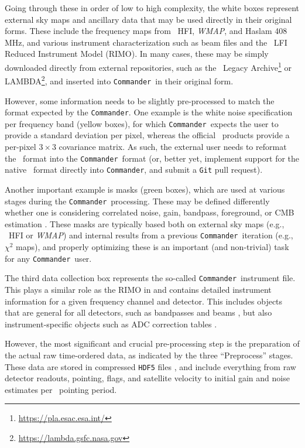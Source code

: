 \documentclass[twocolumn]{aa}
\def\WMAP{\textit{WMAP}}
\def\commander{\texttt{Commander}}
\begin{document}
Going through these in order of low to high complexity, the white boxes represent external sky maps and ancillary data that may be used directly in their original forms. These include the frequency maps from \Planck\ HFI, \WMAP, and Haslam 408\,MHz, and various instrument characterization such as beam files and the \Planck\ LFI Reduced Instrument Model (RIMO). In many cases, these may be simply downloaded directly from external repositories, such as the \Planck\ Legacy Archive\footnote{\url{https://pla.esac.esa.int/}} or LAMBDA\footnote{\url{https://lambda.gsfc.nasa.gov}}, and inserted into \commander\ in their original form.

However, some information needs to be slightly pre-processed to match the format expected by the \commander. One example is the white noise specification per frequency band (yellow boxes), for which \commander\ expects the user to provide a standard deviation per pixel, whereas the official \Planck\ products provide a per-pixel $3\times 3$ covariance matrix. As such, the external user needs to reformat the \Planck\ format into the \commander\ format (or, better yet, implement support for the native \Planck\ format directly into \commander, and submit a \texttt{Git} pull request).

Another important example is masks (green boxes), which are used at various stages during the \commander\ processing. These may be defined differently whether one is considering correlated noise, gain, bandpass, foreground, or CMB estimation \citep[e.g.,][]{bp06,bp07,bp11,bp12,BP13,bp14}. These masks are typically based both on external sky maps (e.g., \Planck\ HFI or \WMAP) and internal results from a previous \commander\ iteration (e.g., $\chi^2$ maps), and properly optimizing these is an important (and non-trivial) task for any \commander\ user.

The third data collection box represents the so-called \commander\ instrument file. This plays a similar role as the RIMO in \Planck and contains detailed instrument information for a given frequency channel and detector. This includes objects that are general for all detectors, such as bandpasses and beams \citep{bp08,bp09}, but also instrument-specific objects such as ADC correction tables \citep{bp25}.

However, the most significant and crucial pre-processing step is the preparation of the actual raw time-ordered data, as indicated by the three ``Preprocess'' stages. These data are stored in compressed \texttt{HDF5} files \citep{BP03}, and include everything from raw detector readouts, pointing, flags, and satellite velocity to initial gain and noise estimates per \Planck\ pointing period.
\end{document}
